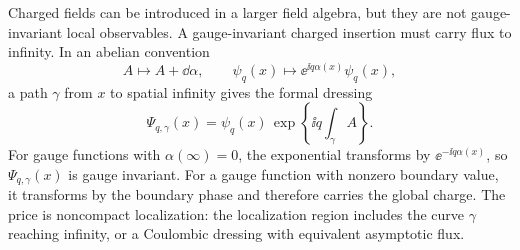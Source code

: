 Charged fields can be introduced in a larger field algebra, but they are not
gauge-invariant local observables.  A gauge-invariant charged insertion must
carry flux to infinity.  In an abelian convention
\[
  A\longmapsto A+\dd\alpha,\qquad
  \psi_q(x)\longmapsto \ee^{\ii q\alpha(x)}\psi_q(x),
\]
a path \(\gamma\) from \(x\) to spatial infinity gives the formal dressing
\begin{equation}
  \Psi_{q,\gamma}(x)
  =
  \psi_q(x)\,
  \exp\!\left\{\ii q\int_\gamma A\right\}.
  \label{eq:charged-wilson-line-dressed-field}
\end{equation}
For gauge functions with \(\alpha(\infty)=0\), the exponential transforms by
\(\ee^{-\ii q\alpha(x)}\), so \(\Psi_{q,\gamma}(x)\) is gauge invariant.  For
a gauge function with nonzero boundary value, it transforms by the boundary
phase and therefore carries the global charge.  The price is noncompact
localization: the localization region includes the curve \(\gamma\) reaching
infinity, or a Coulombic dressing with equivalent asymptotic flux.

